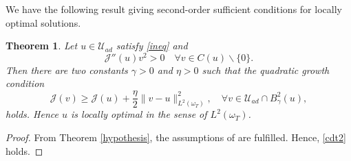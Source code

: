 \documentclass[reqno,twoside]{amsart}
\numberwithin{equation}{section}
\newtheorem{theorem}{Theorem}[section]
\theoremstyle{definition}
\numberwithin{equation}{section}
\def \dis {\displaystyle}
\def \dq {\mathrm{d}x \, \mathrm{d}t}
\def \d {\mathrm{d}}
\begin{document}
We have  the following result giving second-order sufficient conditions for locally optimal solutions.	
\begin{theorem}\label{Quadratic growth}
Let $u\in \mathcal{U}_{ad}$ satisfy \eqref{ineq} and
\begin{equation}\label{cdt1}
	\mathcal{J}''(u)v^2> 0 \quad \forall v\in C(u)\backslash\{0\}.
\end{equation}
Then there are two constants $\gamma>0$ and $\eta>0$ such that the quadratic growth condition
\begin{equation}\label{cdt2}
	\mathcal{J}(v)\geq \mathcal{J}(u)+\frac{\eta}{2}\|v-u\|^2_{L^2(\omega_T)},\quad \forall v\in \mathcal{U}_{ad}\cap B^2_{\gamma}(u),
\end{equation}
holds. Hence $u$ is locally optimal in the sense of $L^2(\omega_T)$.
\end{theorem}
\begin{proof}
From Theorem \ref{hypothesis}, the assumptions of  \cite[Theorem 2.3, page 265]{casas2012} are fulfilled. Hence, \eqref{cdt2} holds.
\end{proof}
\end{document}
